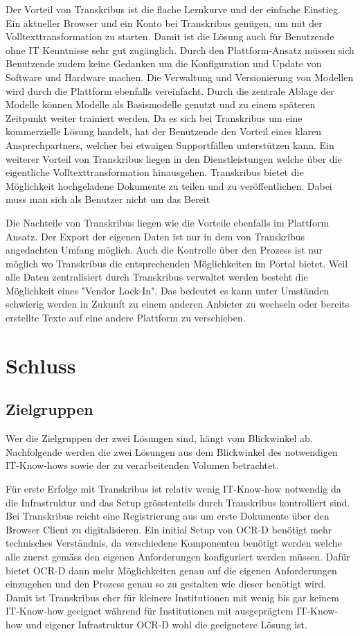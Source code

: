 \documentclass[a4paper,oneside, 12pt]{report}
\begin{document}
Der Vorteil von Transkribus ist die flache Lernkurve und der einfache Einstieg. Ein aktueller Browser und ein Konto bei Transkribus genügen, um mit der Volltexttransformation zu starten. Damit ist die Lösung auch für Benutzende ohne IT Kenntnisse sehr gut zugänglich. Durch den Plattform-Ansatz müssen sich Benutzende zudem keine Gedanken um die Konfiguration und Update von Software und Hardware machen. Die Verwaltung und Versionierung von Modellen wird durch die Plattform ebenfalls vereinfacht. Durch die zentrale Ablage der Modelle können Modelle als Basismodelle genutzt und zu einem späteren Zeitpunkt weiter trainiert werden. Da es sich bei Transkribus um eine kommerzielle Lösung handelt, hat der Benutzende den Vorteil eines klaren Ansprechpartners, welcher bei etwaigen Supportfällen unterstützen kann. Ein weiterer Vorteil von Transkribus liegen in den Dienstleistungen welche über die eigentliche Volltexttransformation hinausgehen. Transkribus bietet die Möglichkeit hochgeladene Dokumente zu teilen und zu veröffentlichen. Dabei muss man sich als Benutzer nicht um das Bereit

Die Nachteile von Transkribus liegen wie die Vorteile ebenfalls im Plattform Ansatz. Der Export der eigenen Daten ist nur in dem von Transkribus angedachten Umfang möglich. Auch die Kontrolle über den Prozess ist nur möglich wo Transkribus die entsprechenden Möglichkeiten im Portal bietet. Weil alle Daten zentralisiert durch Transkribus verwaltet werden besteht die Möglichkeit eines "Vendor Lock-In". Das bedeutet es kann unter Umständen schwierig werden in Zukunft zu einem anderen Anbieter zu wechseln oder bereits erstellte Texte auf eine andere Plattform zu verschieben.

\chapter{Schluss}\label{sec:schluss}

\section{Zielgruppen}
Wer die Zielgruppen der zwei Lösungen sind, hängt vom Blickwinkel ab. Nachfolgende werden die zwei Lösungen aus dem Blickwinkel des notwendigen IT-Know-hows sowie der zu verarbeitenden Volumen betrachtet.

Für erste Erfolge mit Transkribus ist relativ wenig IT-Know-how notwendig da die Infrastruktur und das Setup grösstenteils durch Transkribus kontrolliert sind. Bei Transkribus reicht eine Registrierung aus um erste Dokumente über den Browser Client zu digitalisieren. Ein initial Setup von OCR-D benötigt mehr technisches Verständnis, da verschiedene Komponenten benötigt werden welche alle zuerst gemäss den eigenen Anforderungen konfiguriert werden müssen. Dafür bietet OCR-D dann mehr Möglichkeiten genau auf die eigenen Anforderungen einzugehen und den Prozess genau so zu gestalten wie dieser benötigt wird.  Damit ist Transkribus eher für kleinere Institutionen mit wenig bis gar keinem IT-Know-how geeignet während für Institutionen mit ausgeprägtem IT-Know-how und eigener Infrastruktur OCR-D wohl die geeignetere Lösung ist.
\end{document}
